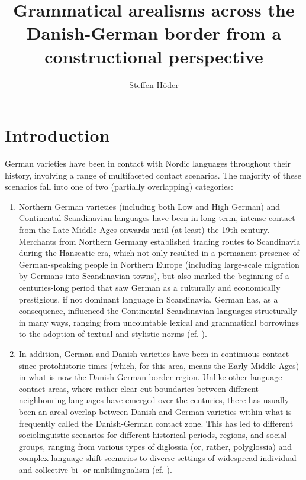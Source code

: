 \documentclass[output=paper]{langsci/langscibook}
\author{Steffen Höder\affiliation{Christian-Albrechts-Universität zu Kiel}}
\title[Grammatical arealisms across the Danish-German border]
      {Grammatical arealisms across the Danish-German border from a constructional perspective}
\begin{document}
\maketitle 


\section{Introduction}
\label{sec:hoeder:1}

German varieties have been in contact with Nordic languages throughout their history, involving a range of multifaceted contact scenarios. The majority of these scenarios fall into one of two (partially overlapping) categories:

\begin{enumerate}
	\item Northern German varieties (including both Low and High German) and Continental Scandinavian languages have been in long-term, intense contact from the Late Middle Ages onwards until (at least) the 19th century. Merchants from Northern Germany established trading routes to Scandinavia during the Hanseatic era, which not only resulted in a permanent presence of German-speaking people in Northern Europe (including large-scale migration by Germans into Scandinavian towns), but also marked the beginning of a centuries-long period that saw German as a culturally and economically prestigious, if not dominant language in Scandinavia. German has, as a consequence, influenced the Continental Scandinavian languages structurally in many ways, ranging from uncountable lexical and grammatical borrowings to the adoption of textual and stylistic norms (cf. \citealt{Braunmuller.2005}).

	\item In addition, German and Danish varieties have been in continuous contact since protohistoric times (which, for this area, means the Early Middle Ages) in what is now the Danish-German border region. Unlike other language contact areas, where rather clear-cut boundaries between different neighbouring languages have emerged over the centuries, there has usually been an areal overlap between Danish and German varieties within what is frequently called the Danish-German contact zone. This has led to different sociolinguistic scenarios for different historical periods, regions, and social groups, ranging from various types of diglossia (or, rather, polyglossia) and complex language shift scenarios to diverse settings of widespread individual and collective bi- or multilingualism (cf. \citealt{Fredsted.2009, Hoder.2019a}).
\end{enumerate}
\end{document}
